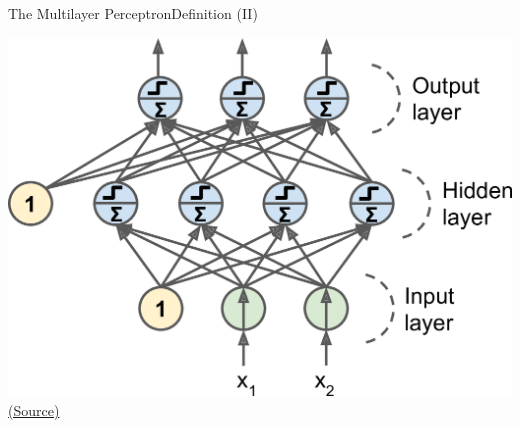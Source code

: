 \documentclass[10pt,compress]{beamer} %
\begin{document}


\begin{frame}{The Multilayer Perceptron}{Definition (II)}
    \begin{center}
    	\includegraphics[width=0.6\paperheight]{figs/mlp.png}\\
		\tiny \href{https://www.oreilly.com/library/view/neural-networks-and/9781492037354/ch01.html}{(Source)}
    \end{center}
\end{frame}
\end{document}
